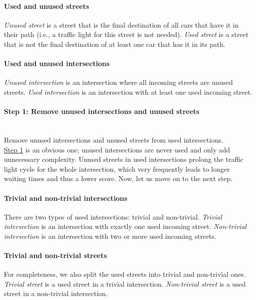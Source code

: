 \paragraph{Used and unused streets}
\textit{Unused street} is a street that is the final destination of all cars that have it in their path (i.e., a traffic light for this street is not needed).
\textit{Used street} is a street that is not the final destination of at least one car that has it in its path.

\paragraph{Used and unused intersections} \textit{Unused intersection} is an intersection where all incoming streets are unused streets. \textit{Used intersection} is an intersection with at least one used incoming street.

\paragraph{Step 1: Remove unused intersections and unused streets} \label{para:step_1} \mbox{} \\
Remove unused intersections and unused streets from used intersections. \\

\hyperref[para:step_1]{Step 1} is an obvious one; unused intersections are never used and only add unnecessary complexity. Unused streets in used intersections prolong the traffic light cycle for the whole intersection, which very frequently leads to longer waiting times and thus a lower score. Now, let us move on to the next step.

\paragraph{Trivial and non-trivial intersections}
There are two types of used intersections: trivial and non-trivial.
\textit{Trivial intersection} is an intersection with exactly one used incoming street. \textit{Non-trivial intersection} is an intersection with two or more used incoming streets.

\paragraph{Trivial and non-trivial streets}
For completeness, we also split the used streets into trivial and non-trivial ones.
\textit{Trivial street} is a used street in a trivial intersection. \textit{Non-trivial street} is a used street in a non-trivial intersection.

